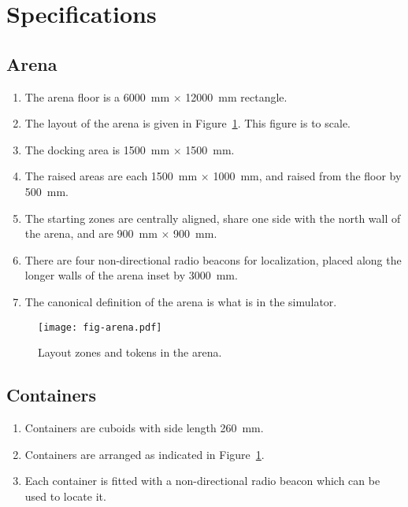 \section{Specifications}
\label{sec:specs}

\subsection{Arena}
\label{spec:arena}

\begin{enumerate}
  \item The arena floor is a \SI{6000}{mm} $\times$ \SI{12000}{mm} rectangle.
  \item The layout of the arena is given in Figure~\ref{fig:arena}. This
        figure is to scale.
  \item The docking area is \SI{1500}{mm} $\times$ \SI{1500}{mm}.
  \item The raised areas are each \SI{1500}{mm} $\times$ \SI{1000}{mm},
        and raised from the floor by \SI{500}{mm}.
  \item The starting zones are centrally aligned, share one side with the
        north wall of the arena, and are \SI{900}{mm} $\times$ \SI{900}{mm}.
  \item There are four non-directional radio beacons for localization, placed
        along the longer walls of the arena inset by \SI{3000}{mm}.
  \item The canonical definition of the arena is what is in the simulator.
\end{enumerate}

\begin{figure}
  \centering
  \texttt{[image: fig-arena.pdf]}
  \caption{Layout zones and tokens in the arena.}
  \label{fig:arena}
\end{figure}

\subsection{Containers}
\label{spec:containers}

\begin{enumerate}
  \item Containers are cuboids with side length \SI{260}{mm}.
  \item Containers are arranged as indicated in Figure~\ref{fig:arena}.
  \item Each container is fitted with a non-directional radio beacon
        which can be used to locate it.
\end{enumerate}

